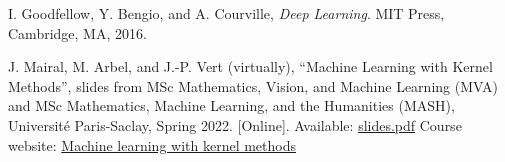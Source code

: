 \begin{thebibliography}{99}

I. Goodfellow, Y. Bengio, and A. Courville, 
\textit{Deep Learning}. 
MIT Press, Cambridge, MA, 2016.

J. Mairal, M. Arbel, and J.-P. Vert (virtually), 
\enquote{Machine Learning with Kernel Methods}, 
slides from MSc Mathematics, Vision, and Machine Learning (MVA) and MSc Mathematics, Machine Learning, and the Humanities (MASH), 
Université Paris-Saclay, Spring 2022. [Online]. Available: \href{https://mva-kernel-methods.github.io/course-2021-2022/static_files/materials/slides.pdf}{slides.pdf}
Course website: \href{https://mva-kernel-methods.github.io/course-2021-2022/}{Machine learning with kernel methods}

\end{thebibliography}
